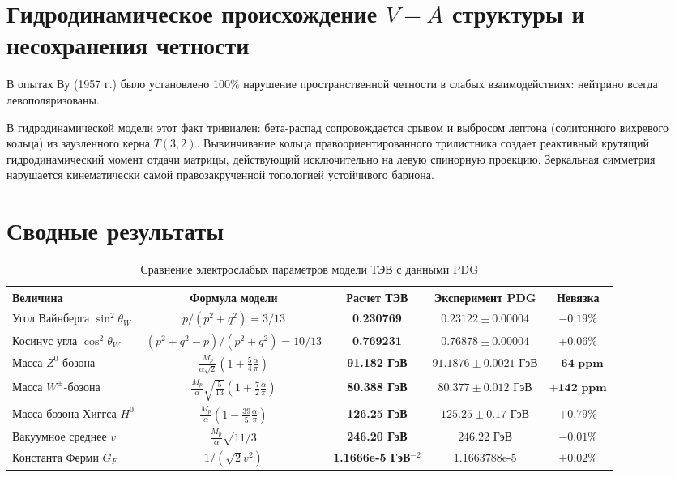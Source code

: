 \documentclass[11pt,a4paper]{article}
\theoremstyle{definition}
\theoremstyle{remark}
\begin{document}
\section{Гидродинамическое происхождение $V-A$ структуры и несохранения четности}
В опытах Ву (1957 г.) было установлено 100\% нарушение пространственной четности в слабых взаимодействиях: нейтрино всегда левополяризованы. 

В гидродинамической модели этот факт тривиален: бета-распад сопровождается срывом и выбросом лептона (солитонного вихревого кольца) из заузленного керна $T(3,2)$. Вывинчивание кольца правоориентированного трилистника создает реактивный крутящий гидродинамический момент отдачи матрицы, действующий исключительно на левую спинорную проекцию. Зеркальная симметрия нарушается кинематически самой правозакрученной топологией устойчивого бариона.

\section{Сводные результаты}

\begin{table}[h]
\centering
\small
\caption{Сравнение электрослабых параметров модели ТЭВ с данными PDG}
\label{tab:electroweak_summary}
\vspace{2mm}
\begin{tabular}{lcccc}
\toprule
\textbf{Величина} & \textbf{Формула модели} & \textbf{Расчет ТЭВ} & \textbf{Эксперимент PDG} & \textbf{Невязка} \\
\midrule
Угол Вайнберга $\sin^2\theta_W$ & $p / (p^2+q^2) = 3/13$ & \textbf{0.230769} & $0.23122 \pm 0.00004$ & $-0.19\%$ \\
Косинус угла $\cos^2\theta_W$ & $(p^2+q^2-p)/(p^2+q^2) = 10/13$ & \textbf{0.769231} & $0.76878 \pm 0.00004$ & $+0.06\%$ \\
Масса $Z^0$-бозона & $\frac{M_p}{\alpha\sqrt{2}}(1 + \frac{5}{4}\frac{\alpha}{\pi})$ & \textbf{91.182 ГэВ} & $91.1876 \pm 0.0021$ ГэВ & $\mathbf{-64\text{ ppm}}$ \\
Масса $W^\pm$-бозона & $\frac{M_p}{\alpha}\sqrt{\frac{5}{13}}(1 + \frac{7}{2}\frac{\alpha}{\pi})$ & \textbf{80.388 ГэВ} & $80.377 \pm 0.012$ ГэВ & $\mathbf{+142\text{ ppm}}$ \\
Масса бозона Хиггса $H^0$ & $\frac{M_p}{\alpha}(1 - \frac{39}{5}\frac{\alpha}{\pi})$ & \textbf{126.25 ГэВ} & $125.25 \pm 0.17$ ГэВ & $+0.79\%$ \\
Вакуумное среднее $v$ & $\frac{M_p}{\alpha}\sqrt{11/3}$ & \textbf{246.20 ГэВ} & $246.22$ ГэВ & $-0.01\%$ \\
Константа Ферми $G_F$ & $1/(\sqrt{2}v^2)$ & \textbf{1.1666e-5 ГэВ$^{-2}$} & $1.1663788\text{e-5}$ & $+0.02\%$ \\
\bottomrule
\end{tabular}
\end{table}
\end{document}

